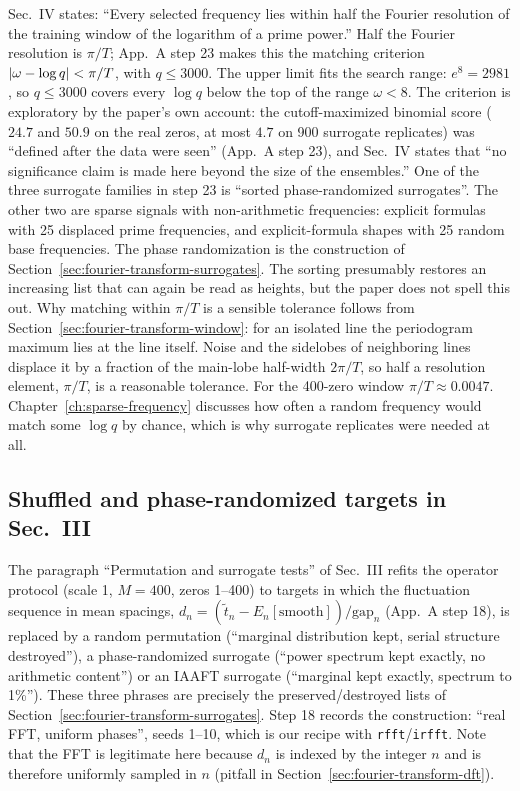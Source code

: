 Sec.~IV states: ``Every selected frequency lies within half the Fourier resolution of the training window of the logarithm of a prime power.'' Half the Fourier resolution is $\pi/T$; App.~A step 23 makes this the matching criterion $\left\lvert \omega-\log q\right\rvert<\pi/T$, with $q\le3000$. The upper limit fits the search range: $e^8=2981$, so $q\le3000$ covers every $\log q$ below the top of the range $\omega<8$. The criterion is exploratory by the paper's own account: the cutoff-maximized binomial score ($24.7$ and $50.9$ on the real zeros, at most $4.7$ on 900 surrogate replicates) was ``defined after the data were seen'' (App.~A step 23), and Sec.~IV states that ``no significance claim is made here beyond the size of the ensembles.'' One of the three surrogate families in step 23 is ``sorted phase-randomized surrogates''. The other two are sparse signals with non-arithmetic frequencies: explicit formulas with 25 displaced prime frequencies, and explicit-formula shapes with 25 random base frequencies. The phase randomization is the construction of Section~\ref{sec:fourier-transform-surrogates}. The sorting presumably restores an increasing list that can again be read as heights, but the paper does not spell this out. Why matching within $\pi/T$ is a sensible tolerance follows from Section~\ref{sec:fourier-transform-window}: for an isolated line the periodogram maximum lies at the line itself. Noise and the sidelobes of neighboring lines displace it by a fraction of the main-lobe half-width $2\pi/T$, so half a resolution element, $\pi/T$, is a reasonable tolerance. For the 400-zero window $\pi/T\approx0.0047$. Chapter~\ref{ch:sparse-frequency} discusses how often a random frequency would match some $\log q$ by chance, which is why surrogate replicates were needed at all.

\subsection{Shuffled and phase-randomized targets in Sec.~III}

The paragraph ``Permutation and surrogate tests'' of Sec.~III refits the operator protocol (scale 1, $M=400$, zeros 1--400) to targets in which the fluctuation sequence in mean spacings, $d_n=(\tilde t_n-E_n[\mathrm{smooth}])/\mathrm{gap}_n$ (App.~A step 18), is replaced by a random permutation (``marginal distribution kept, serial structure destroyed''), a phase-randomized surrogate \cite{theiler} (``power spectrum kept exactly, no arithmetic content'') or an IAAFT surrogate \cite{schreiber} (``marginal kept exactly, spectrum to 1\%''). These three phrases are precisely the preserved/destroyed lists of Section~\ref{sec:fourier-transform-surrogates}. Step 18 records the construction: ``real FFT, uniform phases'', seeds 1--10, which is our recipe with \texttt{rfft}/\texttt{irfft}. Note that the FFT is legitimate here because $d_n$ is indexed by the integer $n$ and is therefore uniformly sampled in $n$ (pitfall in Section~\ref{sec:fourier-transform-dft}).

